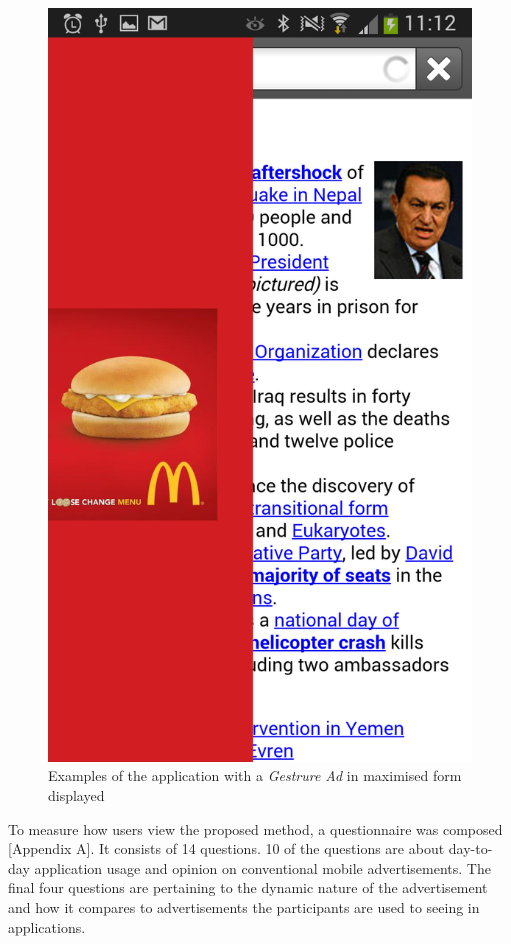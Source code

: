 \begin{figure}
\begin{center}
\includegraphics[scale=0.25]{Images/gesturead_big2.png}
\caption{Examples of the application with a \textit{Gestrure Ad} in maximised form displayed}
\label{fig:ads3}
\end{center}
\end{figure}

To measure how users view the proposed method, a questionnaire was composed [Appendix A]. It consists of 14 questions. 10 of the questions are about day-to-day application usage and opinion on conventional mobile advertisements. The final four questions are pertaining to the dynamic nature of the advertisement and how it compares to advertisements the participants are used to seeing in applications.

